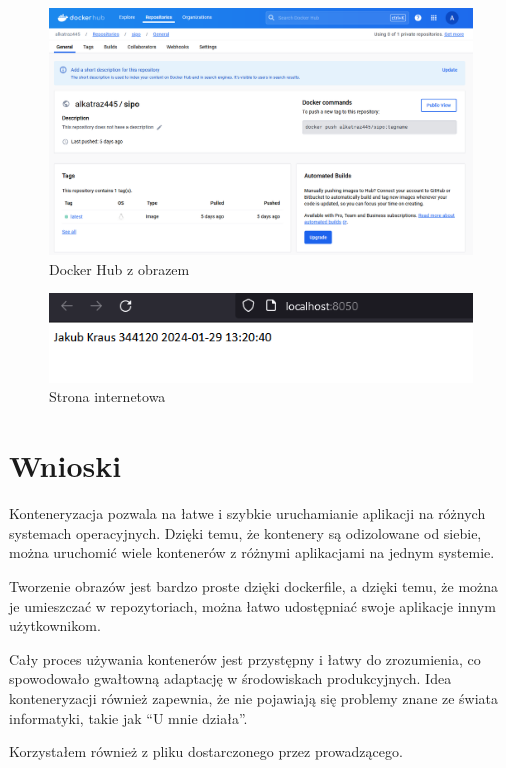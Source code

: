\documentclass[a4paper,12pt]{article}
\begin{document}
\begin{figure}[ht]
    \includegraphics[width=1\textwidth]{images/docker_push.png}
    \caption{Docker Hub z obrazem\cite{kraus_docker_nodate}}
\end{figure}

\begin{figure}
    \includegraphics[width=1\textwidth]{images/website.png}
    \caption{Strona internetowa}
\end{figure}

\newpage


\section{Wnioski}
Konteneryzacja pozwala na łatwe i szybkie uruchamianie aplikacji na różnych systemach operacyjnych. Dzięki temu, że kontenery są odizolowane od siebie, można uruchomić wiele kontenerów z różnymi aplikacjami na jednym systemie.

Tworzenie obrazów jest bardzo proste dzięki dockerfile, a dzięki temu, że można je umieszczać w repozytoriach, można łatwo udostępniać swoje aplikacje innym użytkownikom.

Cały proces używania kontenerów jest przystępny i łatwy do zrozumienia, co spowodowało gwałtowną adaptację w środowiskach produkcyjnych. Idea konteneryzacji również zapewnia, że nie pojawiają się problemy znane ze świata informatyki, takie jak ``U mnie działa''.

\printbibliography[heading=bibintoc]

Korzystałem również z pliku dostarczonego przez prowadzącego.
\end{document}
